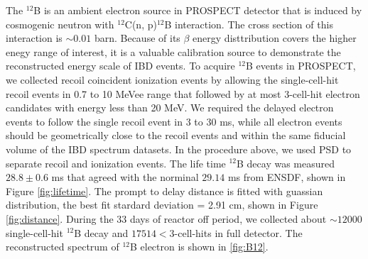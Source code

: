 The $^{12}$B is an ambient electron source in PROSPECT detector that is induced by cosmogenic neutron with $^{12}$C(n, p)$^{12}$B interaction.
The cross section of this interaction is $\sim 0.01$ barn. 
Because of its $\beta$ energy disttribution covers the higher enegy range of interest, it is a valuable calibration source to demonstrate the reconstructed energy scale of IBD events.
To acquire $^{12}$B events in PROSPECT, we collected recoil coincident ionization events by allowing the single-cell-hit recoil events in 0.7 to 10 MeVee range that followed by at most 3-cell-hit electron candidates with energy less than 20 MeV.
We required the delayed electron events to follow the single recoil event in 3 to 30 ms, while all electron events should be geometrically close to the recoil events and within the same fiducial volume of the IBD spectrum datasets.
In the procedure above, we used PSD to separate recoil and ionization events. The life time $^{12}$B decay was measured  $28.8\pm0.6$ ms that agreed with the norminal $29.14$ ms from ENSDF, shown in Figure \ref{fig:lifetime}. 
The prompt to delay distance is fitted with guassian distribution, the best fit stardard deviation = 2.91 cm, shown in Figure \ref{fig:distance}. 
During the 33 days of reactor off period, we collected about $\sim12000$ single-cell-hit $^{12}$B decay and $17514 <$3-cell-hits in full detector. 
The reconstructed spectrum of $^{12}$B electron is shown in \ref{fig:B12}.
